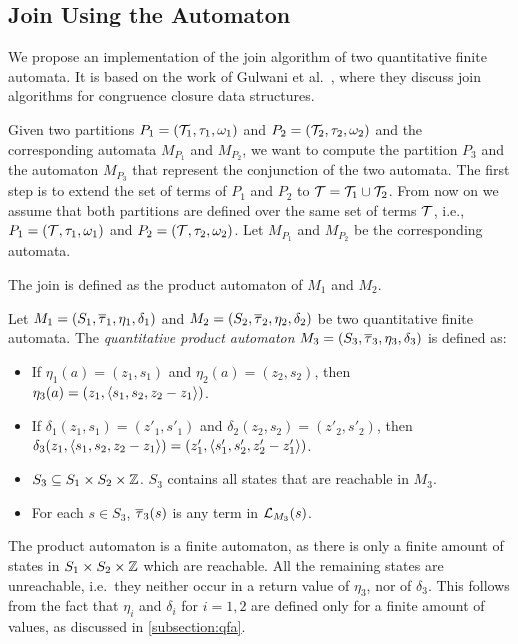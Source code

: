 \subsection{Join Using the Automaton}

We propose an implementation of the join algorithm of two quantitative finite automata.
It is based on the work of Gulwani et al.~\cite{join}, where they discuss join algorithms for congruence closure data structures.

Given two partitions $P_1 = (\mathcal{T}_1, \tau_1, \omega_1)$ and $P_2 = (\mathcal{T}_2, \tau_2, \omega_2)$ and the corresponding automata $M_{P_1}$ and $M_{P_2}$, we want to compute the partition $P_3$ and the automaton $M_{P_3}$ that represent the conjunction of the two automata.
The first step is to extend the set of terms of $P_1$ and $P_2$ to $\mathcal{T} = \mathcal{T}_1 \cup \mathcal{T}_2$.
From now on we assume that both partitions are defined over the same set of terms $\mathcal{T}$,
i.e., $P_1 = (\mathcal{T}, \tau_1, \omega_1)$ and $P_2 = (\mathcal{T}, \tau_2, \omega_2)$.
Let $M_{P_1}$ and $M_{P_2}$ be the corresponding automata.

The join is defined as the product automaton of $M_1$ and $M_2$.

\begin{definition}
    Let $M_1 = (S_1, \overline{\tau}_1, \eta_1, \delta_1)$ and $M_2 = (S_2, \overline{\tau}_2, \eta_2, \delta_2)$ be two quantitative finite automata. The \emph{quantitative product automaton} $M_3 = (S_3, \overline{\tau}_3, \eta_3, \delta_3)$ is defined as:
    \begin{itemize}
        \item If $\eta_1(a) = (z_1, s_1)$ and $\eta_2(a) = (z_2, s_2)$, then
              $\eta_3(a) = (z_1, \langle s_1, s_2, z_2-z_1\rangle)$.
        \item If $\delta_1(z_1, s_1) = (z'_1, s'_1)$ and $\delta_2(z_2, s_2) = (z'_2, s'_2)$, then $\delta_3(z_1, \langle s_1, s_2, z_2 - z_1\rangle) =  (z'_1, \langle s'_1, s'_2, z'_2 -z'_1\rangle)$.
        \item $S_3 \subseteq S_1 \times S_2 \times \mathbb{Z}$. $S_3$ contains all states that are reachable in $M_3$.
        \item For each $s \in S_3$, $\overline{\tau}_3(s)$ is any term in $\mathcal{L}_{M_3}(s)$.
    \end{itemize}
\end{definition}

The product automaton is a finite automaton, as there is only a finite amount of states in $S_1 \times S_2 \times \mathbb{Z}$ which are reachable.
All the remaining states are unreachable, i.e.\ they neither occur in a return value of $\eta_3$, nor of $\delta_3$.
This follows from the fact that $\eta_i$ and $\delta_i$ for $i = 1,2$ are defined only for a finite amount of values, as discussed in \cref{subsection:qfa}.

